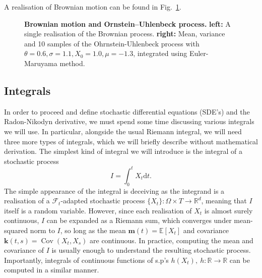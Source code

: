 \noindent
A realisation of Brownian motion can be found in Fig.~\ref{fig:sp-brown}.
\begin{figure}[h]
	\centering
	\caption[Brownian motion and Ornstein–Uhlenbeck process
	]{\textbf{Brownian motion and Ornstein–Uhlenbeck process.} 
		\textbf{left:} A single realisation of the Brownian process. \textbf{right:} Mean, variance and 10 samples of the Ohrnstein-Uhlenbeck process with $\theta=0.6, \sigma=1.1, X_0=1.0, \mu=-1.3$, integrated using Euler-Maruyama method.}
	\label{fig:sp-brown}
\end{figure}

\subsection{Integrals}
In order to proceed and define stochastic differential equations (SDE's) and the Radon-Nikodyn derivative, we must spend some time discussing various integrals we will use. In particular, alongside the usual Riemann integral, we will need three more types of integrals, which we will briefly describe without mathematical derivation. The simplest kind of integral we will introduce is the integral of a stochastic process
\begin{equation}
	I = \int_{0}^{t} X_t \mathrm{d}t.
\end{equation}
The simple appearance of the integral is deceiving as the integrand is a realisation of a $\mathcal{F}_t$-adapted stochastic process $\{X_t\}: \Omega \times T \rightarrow \mathbb{R}^{d}$, meaning that $I$ itself is a random variable. However, since each realisation of $X_t$ is almost surely continuous, $I$ can be expanded as a Riemann sum, which converges under mean-squared norm to $I$, so long as the mean $\mathbf{m}(t) = \mathbb{E}[X_t]$ and covariance $\textbf{k}(t,s) = \operatorname{Cov}(X_t, X_s)$ are continuous. In practice, computing the mean and covariance of $I$ is usually enough to understand the resulting stochastic process. Importantly, integrals of continuous functions of s.p's $h(X_t),~ h: \mathbb{R} \rightarrow \mathbb{R}$ can be computed in a similar manner.

